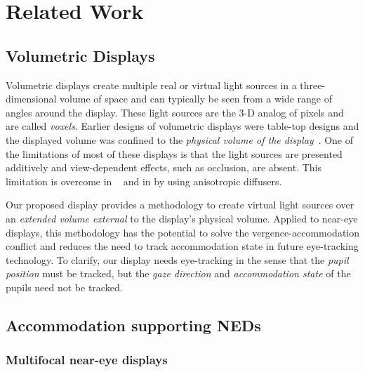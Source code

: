 \section{Related Work}
\label{sec:volumetric:related_work}

\subsection{Volumetric Displays}
\label{sec:volumetric:volumetric_displays}

Volumetric displays create multiple real or virtual light sources in a three-dimensional volume of space and can typically be seen from a wide range of angles around the display. These light sources are the 3-D analog of pixels and are called \emph{voxels}. Earlier designs of volumetric displays were table-top designs and the displayed volume was confined to the \emph{physical volume of the display}~\cite{Favalora2002100, Sullivan2004Depthcube, Cossairt2007Geometric, Ochiai2016Fairy, Refai2009Static, Smalley2018photophoretic}. One of the limitations of most of these displays is that the light sources are presented additively and view-dependent effects, such as occlusion, are absent. This limitation is overcome in ~\citet{Cossairt2007Geometric} and in \citet{Jones2007Rendering} by using anisotropic diffusers.

Our proposed display provides a methodology to create virtual light sources over an \emph{extended volume external} to the display's physical volume. Applied to near-eye displays, this methodology has the potential to solve the vergence-accommodation conflict and reduces the need to track accommodation state in future eye-tracking technology. To clarify, our display needs eye-tracking in the sense that the \emph{pupil position} must be tracked, but the \emph{gaze direction} and \emph{accommodation state} of the pupils need not be tracked.

\subsection{Accommodation supporting NEDs}
\label{sec:volumetric:accommodation_neds}
\subsubsection{Multifocal near-eye displays}
\label{sec:volumetric:multifocal_displays}

